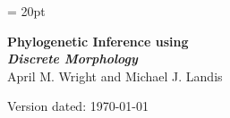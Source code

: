 \documentclass[11pt]{article}
\begin{document}
\renewcommand{\headrulewidth}{0.5pt}
\headsep = 20pt
\lhead{ }

\thispagestyle{plain}
\begin{center}

\textbf{\LARGE Phylogenetic Inference using \RevBayes}\\\vspace{2mm}
\textbf{\it{\Large Discrete Morphology}}\\\vspace{2mm}
\vspace{1cm}
{\Large April M. Wright and Michael J. Landis}
\vspace{1cm}
\end{center}

\def \ResourcePath {./}
\def \GlobalResourcePath {./}








Version dated: \today
\end{document}
